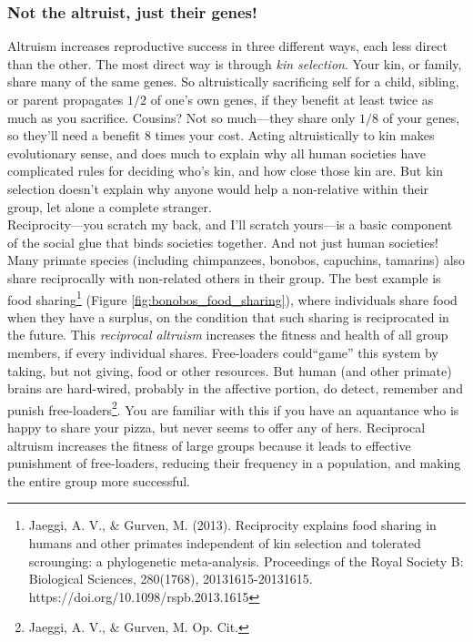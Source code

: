 \subsubsection{Not the altruist, just their genes!}
Altruism increases reproductive success in three different ways, each less direct than the other. The most direct way is through \emph{kin selection}. Your kin, or family, share many of the same genes. So altruistically sacrificing self for a child, sibling, or parent propagates $1/2$ of one's own genes, if they benefit at least twice as much as you sacrifice. Cousins? Not so much---they share only $1/8$ of your genes, so they'll need a benefit 8 times your cost. Acting altruistically to kin makes evolutionary sense, and does much to explain why all human societies have complicated rules for deciding who's kin, and how close those kin are. But kin selection doesn't explain why anyone would help a non-relative within their group, let alone a complete stranger. \\

Reciprocity---you scratch my back, and I'll scratch yours---is a basic component of the social glue that binds societies together. And not just human societies! Many primate species (including chimpanzees, bonobos, capuchins, tamarins) also share reciprocally with non-related others in their group. The best example is food sharing\footnote{Jaeggi, A. V., \& Gurven, M. (2013). Reciprocity explains food sharing in humans and other primates independent of kin selection and tolerated scrounging: a phylogenetic meta-analysis. Proceedings of the Royal Society B: Biological Sciences, 280(1768), 20131615-20131615. https://doi.org/10.1098/rspb.2013.1615} (Figure \ref{fig:bonobos_food_sharing}), where individuals share food when they have a surplus, on the condition that such sharing is reciprocated in the future. This \emph{reciprocal altruism} increases the fitness and health of all group members, if every individual shares. Free-loaders could``game'' this system by taking, but not giving, food or other resources. But human (and other primate) brains are hard-wired, probably in the affective portion, do detect, remember and punish free-loaders\footnote{Jaeggi, A. V., \& Gurven, M. Op. Cit.}. You are familiar with this if you have an aquantance who is happy to share your pizza, but never seems to offer any of hers. Reciprocal altruism increases the fitness of large groups because it leads to effective punishment of free-loaders, reducing their frequency in a population, and making the entire group more successful.\\
 

